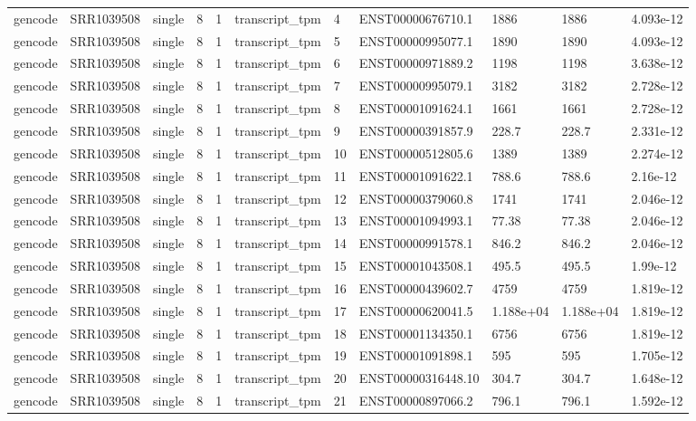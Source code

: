 \begin{tabular}{lllllllllll}
gencode & SRR1039508 & single & 8 & 1 & transcript\_tpm & 4 & ENST00000676710.1 & 1886 & 1886 & 4.093e-12 \\
gencode & SRR1039508 & single & 8 & 1 & transcript\_tpm & 5 & ENST00000995077.1 & 1890 & 1890 & 4.093e-12 \\
gencode & SRR1039508 & single & 8 & 1 & transcript\_tpm & 6 & ENST00000971889.2 & 1198 & 1198 & 3.638e-12 \\
gencode & SRR1039508 & single & 8 & 1 & transcript\_tpm & 7 & ENST00000995079.1 & 3182 & 3182 & 2.728e-12 \\
gencode & SRR1039508 & single & 8 & 1 & transcript\_tpm & 8 & ENST00001091624.1 & 1661 & 1661 & 2.728e-12 \\
gencode & SRR1039508 & single & 8 & 1 & transcript\_tpm & 9 & ENST00000391857.9 & 228.7 & 228.7 & 2.331e-12 \\
gencode & SRR1039508 & single & 8 & 1 & transcript\_tpm & 10 & ENST00000512805.6 & 1389 & 1389 & 2.274e-12 \\
gencode & SRR1039508 & single & 8 & 1 & transcript\_tpm & 11 & ENST00001091622.1 & 788.6 & 788.6 & 2.16e-12 \\
gencode & SRR1039508 & single & 8 & 1 & transcript\_tpm & 12 & ENST00000379060.8 & 1741 & 1741 & 2.046e-12 \\
gencode & SRR1039508 & single & 8 & 1 & transcript\_tpm & 13 & ENST00001094993.1 & 77.38 & 77.38 & 2.046e-12 \\
gencode & SRR1039508 & single & 8 & 1 & transcript\_tpm & 14 & ENST00000991578.1 & 846.2 & 846.2 & 2.046e-12 \\
gencode & SRR1039508 & single & 8 & 1 & transcript\_tpm & 15 & ENST00001043508.1 & 495.5 & 495.5 & 1.99e-12 \\
gencode & SRR1039508 & single & 8 & 1 & transcript\_tpm & 16 & ENST00000439602.7 & 4759 & 4759 & 1.819e-12 \\
gencode & SRR1039508 & single & 8 & 1 & transcript\_tpm & 17 & ENST00000620041.5 & 1.188e+04 & 1.188e+04 & 1.819e-12 \\
gencode & SRR1039508 & single & 8 & 1 & transcript\_tpm & 18 & ENST00001134350.1 & 6756 & 6756 & 1.819e-12 \\
gencode & SRR1039508 & single & 8 & 1 & transcript\_tpm & 19 & ENST00001091898.1 & 595 & 595 & 1.705e-12 \\
gencode & SRR1039508 & single & 8 & 1 & transcript\_tpm & 20 & ENST00000316448.10 & 304.7 & 304.7 & 1.648e-12 \\
gencode & SRR1039508 & single & 8 & 1 & transcript\_tpm & 21 & ENST00000897066.2 & 796.1 & 796.1 & 1.592e-12 \\

\end{tabular}
